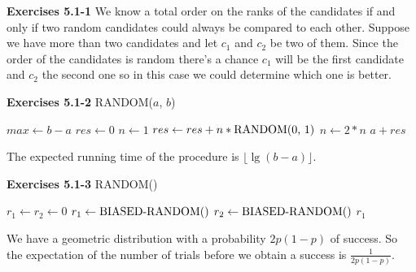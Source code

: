 \documentclass[a4paper,12pt]{article}
\newcommand{\newpar}[1]
{\bigskip \noindent \textbf{Exercises #1} \newline}
\newcommand{\la}{\leftarrow}
\begin{document}
\newpar{5.1-1} We know a total order on the ranks of the candidates if
and only if two random candidates could always be compared to each
other.  Suppose we have more than two candidates and let $c_1$ and
$c_2$ be two of them.  Since the order of the candidates is random
there's a chance $c_1$ will be the first candidate and $c_2$ the
second one so in this case we could determine which one is better.

\newpar{5.1-2}
\textmd{RANDOM($a$, $b$)}
\begin{algorithmic}
  \STATE $max \la b-a$
  \STATE $res \la 0$
  \STATE $n \la 1$
  \STATE $res \la res + n * \textmd{RANDOM(0, 1)}$
  \STATE $n \la 2 * n$
  \ENDWHILE
  \RETURN $a+res$
\end{algorithmic}
The expected running time of the procedure is
$\lfloor\lg(b-a)\rfloor$.

\newpar{5.1-3}
\textmd{RANDOM()}
\begin{algorithmic}
  \STATE $r_1 \la r_2 \la 0$
  \STATE $r_1 \la \textmd{BIASED-RANDOM()}$
  \STATE $r_2 \la \textmd{BIASED-RANDOM()}$
  \ENDWHILE
  \RETURN $r_1$
\end{algorithmic}
We have a geometric distribution with a probability $2p(1-p)$ of success.
So the expectation of the number of trials before we obtain a success
is $\frac{1}{2p(1-p)}$.
\end{document}
